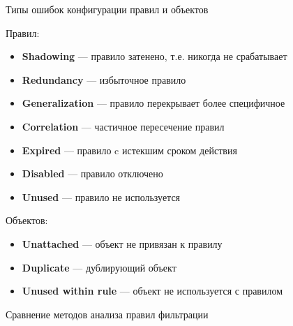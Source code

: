 \documentclass[10pt]{beamer}
\begin{document}
\begin{frame}{Типы ошибок конфигурации правил и объектов}
    \begin{block}{Правил:}
        \begin{itemize}
            \item[\textcolor{red}{\textbf{!}}] \textbf{Shadowing} --- правило затенено, т.е. никогда не срабатывает
            \item[\textcolor{red}{\textbf{!}}] \textbf{Redundancy} --- избыточное правило
            \item[\textcolor{red}{\textbf{!}}] \textbf{Generalization} --- правило перекрывает более специфичное
            \item[\textcolor{red}{\textbf{!}}] \textbf{Correlation} --- частичное пересечение правил
            \item \textbf{Expired} --- правило c истекшим сроком действия
            \item \textbf{Disabled} --- правило отключено
            \item \textbf{Unused} --- правило не используется
        \end{itemize}
    \end{block}

    \begin{block}{Объектов:}
        \begin{itemize}
            \item \textbf{Unattached} --- объект не привязан к правилу
            \item \textbf{Duplicate} --- дублирующий объект
            \item \textbf{Unused within rule} --- объект не используется с правилом
        \end{itemize}
    \end{block}
\end{frame}

\begin{frame}{Сравнение методов анализа правил фильтрации}
    \begin{table}
    \centering
    \end{table}
\end{frame}
\end{document}
